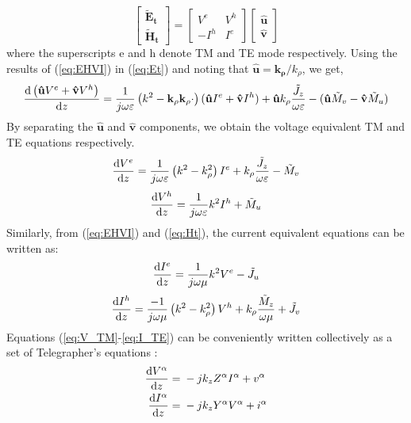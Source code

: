 \documentclass[11pt]{article}
\renewcommand{\v}[1]{\mathbf{#1}} %
\newcommand{\ti}[1]{\tilde{#1}} %
\renewcommand{\O}{\omega}  %
\newcommand{\E}{\varepsilon}  %
\renewcommand{\u}{\mu}  %
\newcommand{\p}{\rho}  %
\renewcommand{\^}{\hat}  %
\begin{document}
  \begin{equation}
    \left[\begin{array}{c}
    \v{\ti{E}_t} \\
    \v{\ti{H}_t}
    \end{array} \right]
    = \left[ \begin{array}{cc}
    V^e & V^h \\
    -I^h & I^e
    \end{array} \right]
    \left[\begin{array}{c}
    \v{\^u} \\
    \v{\^v}
    \end{array} \right]
    \label{eq:EHVI}
  \end{equation}
  where the superscripts e and h denote TM and TE mode respectively.
  Using the results of (\ref{eq:EHVI}) in (\ref{eq:Et}) and noting that $\v{\^u} = \v{k_{\p}}/k_{\p}$, we get,
  \begin{equation}
    \dv{\left(\v{\^u}V^e + \v{\^v}V^h \right)}{z} = \frac{1}{j \O \E}\left( k^2 - \v{k_{\p}}\v{k_{\p}} \cdot \right) (\v{\^u} I^e + \v{\^v}I^h) + \v{\^u}k_{\p} \frac{\ti{J}_z}{\O \E} - (\v{\^u} \ti{M}_v - \v{\^v} \ti{M}_u)
    \label{eq:Vinuv}
  \end{equation}
  By separating the $\v{\^u}$ and $\v{\^v}$ components, we obtain the voltage equivalent TM and TE equations respectively.
  \begin{equation}
    \dv{V^e}{z} = \frac{1}{j \O \E}\left( k^2 - k_{\p}^2 \right)I^e + k_{\p}\frac{\ti{J}_z}{\O \E} - \ti{M}_v
    \label{eq:V_TM}
  \end{equation}
  \begin{equation}
    \dv{V^h}{z} = \frac{1}{j \O \E}k^2 I^h + \ti{M}_u
    \label{eq:V_TE}
  \end{equation}
%
  Similarly, from (\ref{eq:EHVI}) and (\ref{eq:Ht}), the current equivalent equations can be written as:
  \begin{equation}
    \dv{I^e}{z} = \frac{1}{j \O \u}k^2 V^e - \ti{J}_u
    \label{eq:I_TM}
  \end{equation}
  \begin{equation}
    \dv{I^h}{z} = \frac{-1}{j \O \u}\left( k^2 - k_{\p}^2 \right)V^h + k_{\p}\frac{\ti{M}_z}{\O \u} + \ti{J}_v
    \label{eq:I_TE}
  \end{equation}
%
  Equations (\ref{eq:V_TM}-\ref{eq:I_TE}) can be conveniently written collectively as a set of Telegrapher's equations \cite[p. 1166]{michalski2005electromagnetic}:
  \begin{subequations}
    \begin{align}
      \dv{V^{\alpha}}{z} ={}& -j k_z Z^{\alpha}I^{\alpha} + v^{\alpha}
      \label{eq:TL_V}\\
      \dv{I^{\alpha}}{z} ={}& -j k_z Y^{\alpha}V^{\alpha} + i^{\alpha}
      \label{eq:TL_I}
    \end{align}
    \label{eq:TLE}
  \end{subequations}
\end{document}
